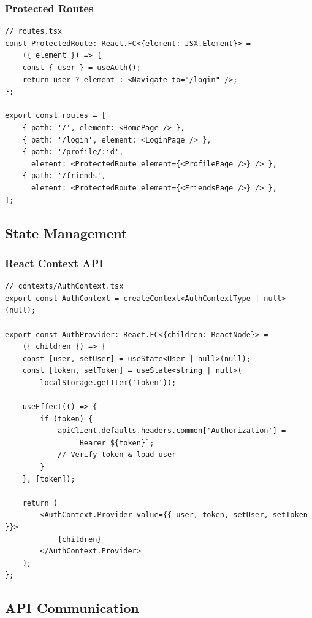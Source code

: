 \subsubsection{Protected Routes}
\begin{verbatim}
// routes.tsx
const ProtectedRoute: React.FC<{element: JSX.Element}> = 
    ({ element }) => {
    const { user } = useAuth();
    return user ? element : <Navigate to="/login" />;
};

export const routes = [
    { path: '/', element: <HomePage /> },
    { path: '/login', element: <LoginPage /> },
    { path: '/profile/:id', 
      element: <ProtectedRoute element={<ProfilePage />} /> },
    { path: '/friends', 
      element: <ProtectedRoute element={<FriendsPage />} /> },
];
\end{verbatim}

\subsection{State Management}

\subsubsection{React Context API}
\begin{verbatim}
// contexts/AuthContext.tsx
export const AuthContext = createContext<AuthContextType | null>(null);

export const AuthProvider: React.FC<{children: ReactNode}> = 
    ({ children }) => {
    const [user, setUser] = useState<User | null>(null);
    const [token, setToken] = useState<string | null>(
        localStorage.getItem('token'));
    
    useEffect(() => {
        if (token) {
            apiClient.defaults.headers.common['Authorization'] = 
                `Bearer ${token}`;
            // Verify token & load user
        }
    }, [token]);
    
    return (
        <AuthContext.Provider value={{ user, token, setUser, setToken }}>
            {children}
        </AuthContext.Provider>
    );
};
\end{verbatim}

\subsection{API Communication}


